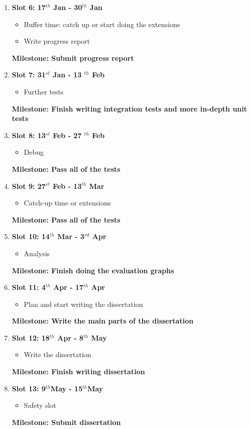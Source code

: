 \begin{enumerate}
\begin{itemize}
		\item Implement the edge-detector
	\end{itemize}
	{\bf Milestone: Finish implementation, Pass the unit tests for the edge-detection module} 
\item {\bf Slot 6: 17$^{th}$ Jan  - 30$^{th}$ Jan}
	\begin{itemize}
		\item Buffer time: catch up or start doing the extensions
		\item Write progress report
	\end{itemize}
	{\bf Milestone: Submit progress report} 
\item {\bf Slot 7: 31$^{st}$ Jan - 13 $^{th}$ Feb}
	\begin{itemize}
		\item Further tests
	\end{itemize}
	{\bf Milestone: Finish writing integration tests and more in-depth unit tests} 
\item {\bf Slot 8: 13$^{st}$ Feb - 27 $^{th}$ Feb}
	\begin{itemize}
		\item Debug
	\end{itemize}
	{\bf Milestone: Pass all of the tests}
\item {\bf Slot 9: 27$^{st}$ Feb - 13$^{th}$ Mar}
	\begin{itemize}
		\item Catch-up time or extensions
	\end{itemize}
	{\bf Milestone: Pass all of the tests} 
\item {\bf Slot 10: 14$^{th}$ Mar - 3$^{rd}$ Apr}
	\begin{itemize}
		\item Analysis
	\end{itemize}
	{\bf Milestone: Finish doing the evaluation graphs} 
\item {\bf Slot 11: 4$^{th}$ Apr - 17$^{th}$ Apr}
	\begin{itemize}
		\item Plan and start writing the dissertation
	\end{itemize}
	{\bf Milestone: Write the main parts of the dissertation}
\item {\bf Slot 12: 18$^{th}$ Apr - 8$^{th}$ May}
	\begin{itemize}
		\item Write the dissertation
	\end{itemize}
	{\bf Milestone: Finish writing dissertation}	 
\item {\bf Slot 13: 9$^{th}$May  - 15$^{th}$May}
	\begin{itemize}
		\item Safety slot
	\end{itemize}
	{\bf Milestone: Submit dissertation} 
\end{enumerate}

